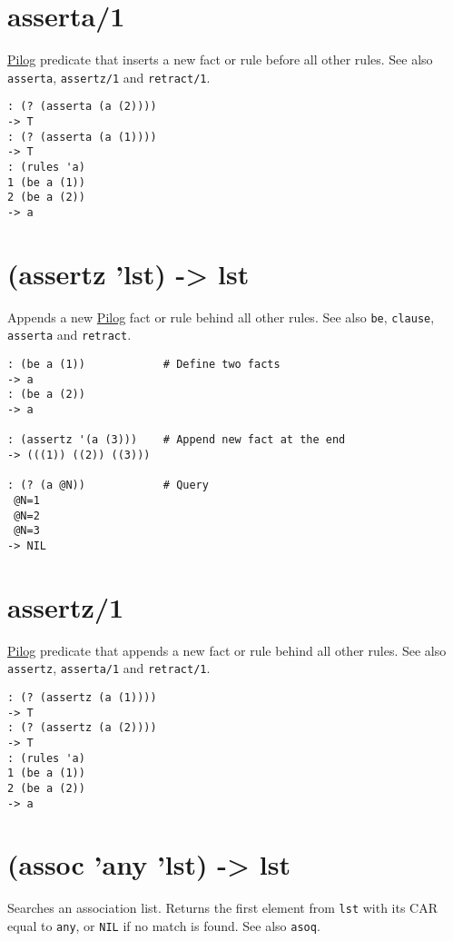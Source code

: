 { 
\section{asserta/1}
\label{sec-8-1-1-29}


\hyperref[ref.html-pilog]{Pilog} predicate that inserts a new fact or rule
before all other rules. See also \texttt{asserta}, \texttt{assertz/1} and \texttt{retract/1}.


\begin{verbatim}
: (? (asserta (a (2))))
-> T
: (? (asserta (a (1))))
-> T
: (rules 'a)
1 (be a (1))
2 (be a (2))
-> a
\end{verbatim}

 
\section{(assertz 'lst) -> lst}
\label{sec-8-1-1-30}


Appends a new \hyperref[ref.html-pilog]{Pilog} fact or rule behind all other
rules. See also \texttt{be}, \texttt{clause}, \texttt{asserta} and \texttt{retract}.


\begin{verbatim}
: (be a (1))            # Define two facts
-> a
: (be a (2))
-> a

: (assertz '(a (3)))    # Append new fact at the end
-> (((1)) ((2)) ((3)))

: (? (a @N))            # Query
 @N=1
 @N=2
 @N=3
-> NIL
\end{verbatim}

 
\section{assertz/1}
\label{sec-8-1-1-31}


\hyperref[ref.html-pilog]{Pilog} predicate that appends a new fact or rule
behind all other rules. See also \texttt{assertz}, \texttt{asserta/1} and \texttt{retract/1}.


\begin{verbatim}
: (? (assertz (a (1))))
-> T
: (? (assertz (a (2))))
-> T
: (rules 'a)
1 (be a (1))
2 (be a (2))
-> a
\end{verbatim}

 
\section{(assoc 'any 'lst) -> lst}
\label{sec-8-1-1-32}


Searches an association list. Returns the first element from \texttt{lst} with
its CAR equal to \texttt{any}, or \texttt{NIL} if no match is found. See also \texttt{asoq}.


}
